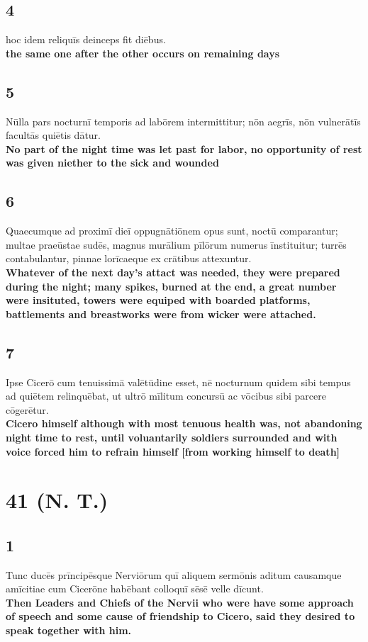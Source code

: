 \documentclass{article}
\begin{document}
\subsection*{4}
hoc idem reliquīs deinceps fit diēbus.\\
\textbf{the same one after the other occurs on remaining days}

\subsection*{5}
Nūlla pars nocturnī temporis ad labōrem intermittitur; nōn aegrīs, nōn vulnerātīs facultās quiētis dātur. \\
\textbf{No part of the night time was let past for labor, no opportunity of rest was given niether to the sick and wounded}


\subsection*{6}
Quaecumque ad proximī dieī oppugnātiōnem opus sunt, noctū comparantur; multae praeūstae sudēs, magnus murālium pīlōrum numerus īnstituitur; turrēs contabulantur, pinnae lorīcaeque ex crātibus attexuntur. \\
\textbf{Whatever of the next day's attact was needed, they were prepared during the night; many spikes, burned at the end, a great number were insituted, towers were equiped with boarded platforms, battlements and breastworks were from wicker were attached.}


\subsection*{7}
Ipse Cicerō cum tenuissimā valētūdine esset, nē nocturnum quidem sibi tempus ad quiētem relinquēbat, ut ultrō mīlitum concursū ac vōcibus sibi parcere cōgerētur.\\
\textbf{Cicero himself although with most tenuous health was, not abandoning night time to rest, until voluantarily soldiers surrounded and with voice forced him to refrain himself [from working himself to death]}

\break

\section*{41 (N. T.)}


\subsection*{1}
Tunc ducēs prīncipēsque Nerviōrum quī aliquem sermōnis aditum causamque amīcitiae cum Cicerōne habēbant colloquī sēsē velle dīcunt.\\
\textbf{Then Leaders and Chiefs of the Nervii who were have some approach of speech and some cause of friendship to Cicero, said they desired to speak together with him.}
\end{document}
